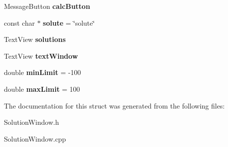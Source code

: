 \begin{DoxyCompactItemize}
\item 
\hypertarget{struct_solution_window_a1022c37f483309ed22237043b5454614}{
MessageButton {\bfseries calcButton}}
\label{struct_solution_window_a1022c37f483309ed22237043b5454614}

\item 
\hypertarget{struct_solution_window_a4e207ce02c4161839da7448825e51b42}{
const char $\ast$ {\bfseries solute} = \char`\"{}solute\char`\"{}}
\label{struct_solution_window_a4e207ce02c4161839da7448825e51b42}

\item 
\hypertarget{struct_solution_window_a7acf2d96092ec6254f5dde5ca9fa5b27}{
TextView {\bfseries solutions}}
\label{struct_solution_window_a7acf2d96092ec6254f5dde5ca9fa5b27}

\item 
\hypertarget{struct_solution_window_ae4813ff258c826e4956286e327f16044}{
TextView {\bfseries textWindow}}
\label{struct_solution_window_ae4813ff258c826e4956286e327f16044}

\item 
\hypertarget{struct_solution_window_a0790e352f0b21712488f063fe52dbbed}{
double {\bfseries minLimit} = -\/100}
\label{struct_solution_window_a0790e352f0b21712488f063fe52dbbed}

\item 
\hypertarget{struct_solution_window_a682969b1ad756864beaacb4fa1b8120d}{
double {\bfseries maxLimit} = 100}
\label{struct_solution_window_a682969b1ad756864beaacb4fa1b8120d}

\end{DoxyCompactItemize}


The documentation for this struct was generated from the following files:\begin{DoxyCompactItemize}
\item 
SolutionWindow.h\item 
SolutionWindow.cpp\end{DoxyCompactItemize}
